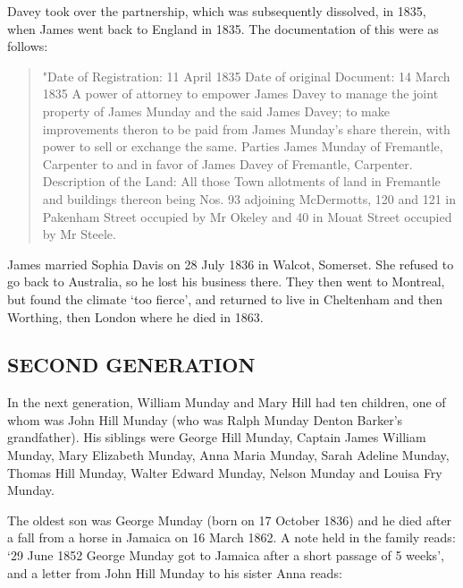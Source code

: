 Davey took over the partnership, which was subsequently dissolved, in 1835, when James went back to England in 1835. The documentation of this were as follows:
\begin{quotation}
"Date of Registration: 11 April 1835
Date of original Document: 14 March 1835
A power of attorney to empower James Davey to manage the joint property of James Munday and the said James Davey; to make improvements theron to be paid from James Munday's share therein, with power to sell or exchange the same. Parties James Munday of Fremantle, Carpenter to and in favor of James Davey of Fremantle, Carpenter.
Description of the Land:
All those Town allotments of land in Fremantle and buildings thereon being
Nos. 93 adjoining McDermotts,
120 and 121 in Pakenham Street occupied by Mr Okeley and
40 in Mouat Street occupied by Mr Steele.
\end{quotation}

James married Sophia Davis on 28 July 1836 in	Walcot, Somerset.  She refused to go back to Australia, so he lost his business there. They then went to Montreal, but found the climate `too fierce', and returned to live in Cheltenham and then Worthing, then London where he died in 1863.

\subsection{SECOND GENERATION}

In the next generation, William Munday and Mary Hill had ten children, one of whom was John Hill Munday (who was Ralph Munday Denton Barker's grandfather). His siblings were George Hill Munday, Captain James William Munday, Mary Elizabeth Munday, Anna Maria Munday, Sarah Adeline Munday, Thomas Hill Munday, Walter Edward Munday, Nelson Munday and Louisa Fry Munday. 

The oldest son was George Munday (born on 17 October 1836) and he died after a fall from a horse in Jamaica on 16 March 1862. A note held in the family reads: `29 June 1852 George Munday got to Jamaica after a short passage of 5 weeks', and a letter from John Hill Munday to his sister Anna reads:

